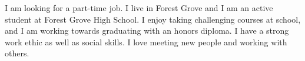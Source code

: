 

\begin{cvparagraph}

I am looking for a part-time job.  I live in Forest Grove and I am an active student at Forest Grove High School. I enjoy taking challenging courses at school, and I am working towards graduating with an honors diploma. I have a strong work ethic as well as social skills. I love meeting new people and working with others.
\end{cvparagraph}
